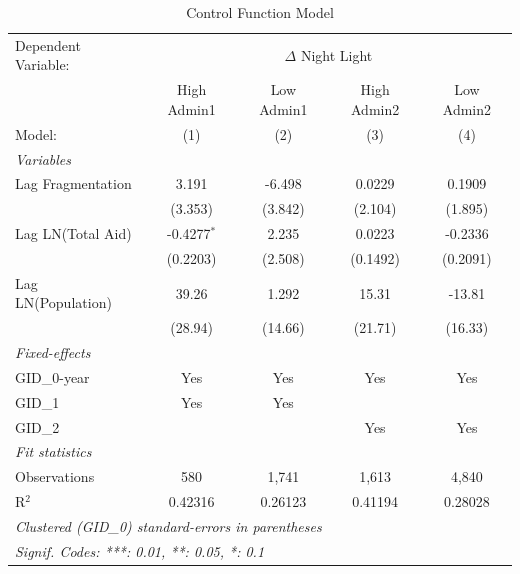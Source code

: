 \begin{table}[htbp]
\centering
\caption{Control Function Model}
\label{tab:cfa_results}
\begin{tabular}{lcccc}
   \tabularnewline \midrule \midrule
   Dependent Variable: & \multicolumn{4}{c}{$\Delta$ Night Light}\\
                      & High Admin1             & Low Admin1              & High Admin2             & Low Admin2 \\   
   Model:             & (1)                     & (2)                     & (3)                     & (4)\\  
   \midrule
   \emph{Variables}\\
   Lag Fragmentation        & 3.191                   & -6.498                  & 0.0229                  & 0.1909\\   
                      & (3.353)                 & (3.842)                 & (2.104)                 & (1.895)\\   
   Lag LN(Total Aid)  & -0.4277$^{*}$           & 2.235                   & 0.0223                  & -0.2336\\   
                      & (0.2203)                & (2.508)                 & (0.1492)                & (0.2091)\\   
   Lag LN(Population) & 39.26                   & 1.292                   & 15.31                   & -13.81\\   
                      & (28.94)                 & (14.66)                 & (21.71)                 & (16.33)\\   
   \midrule
   \emph{Fixed-effects}\\
   GID\_0-year        & Yes                     & Yes                     & Yes                     & Yes\\  
   GID\_1             & Yes                     & Yes                     &                         & \\  
   GID\_2             &                         &                         & Yes                     & Yes\\  
   \midrule
   \emph{Fit statistics}\\
   Observations       & 580                     & 1,741                   & 1,613                   & 4,840\\  
   R$^2$              & 0.42316                 & 0.26123                 & 0.41194                 & 0.28028\\  
   \midrule \midrule
   \multicolumn{5}{l}{\emph{Clustered (GID\_0) standard-errors in parentheses}}\\
   \multicolumn{5}{l}{\emph{Signif. Codes: ***: 0.01, **: 0.05, *: 0.1}}\\
\end{tabular}
\end{table}


